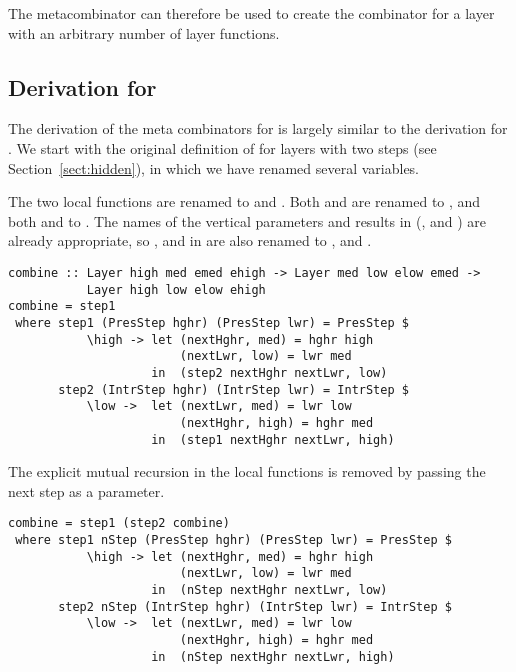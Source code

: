 \documentclass[preprint,natbib]{sigplanconf}
\begin{document}
The  metacombinator can therefore be used to create the  combinator for a layer with an arbitrary number of layer functions. \ec

%																
\subsection{Derivation for } \label{subsubsectcombine}


The derivation of the meta combinators for  is largely similar to the derivation for . We start with the original definition of  for layers with two steps (see Section~\ref{sect:hidden}), in which we have renamed several variables. 

\bc The two local functions are renamed to  and . Both  and  are renamed to , and both  and  to . The names of the vertical parameters and results in  (,  and ) are already appropriate, so ,  and  in  are also renamed to ,  and . \ec

\begin{small} %
\begin{verbatim}
combine :: Layer high med emed ehigh -> Layer med low elow emed -> 
           Layer high low elow ehigh
combine = step1
 where step1 (PresStep hghr) (PresStep lwr) = PresStep $
           \high -> let (nextHghr, med) = hghr high
                        (nextLwr, low) = lwr med
                    in  (step2 nextHghr nextLwr, low)
       step2 (IntrStep hghr) (IntrStep lwr) = IntrStep $
           \low ->  let (nextLwr, med) = lwr low
                        (nextHghr, high) = hghr med
                    in  (step1 nextHghr nextLwr, high)
\end{verbatim}
\end{small}

The explicit mutual recursion in the local functions is removed by passing the next step as a parameter.

\begin{small}
\begin{verbatim}
combine = step1 (step2 combine)
 where step1 nStep (PresStep hghr) (PresStep lwr) = PresStep $
           \high -> let (nextHghr, med) = hghr high
                        (nextLwr, low) = lwr med
                    in  (nStep nextHghr nextLwr, low)
       step2 nStep (IntrStep hghr) (IntrStep lwr) = IntrStep $
           \low ->  let (nextLwr, med) = lwr low
                        (nextHghr, high) = hghr med
                    in  (nStep nextHghr nextLwr, high)
\end{verbatim}
\end{small}
\end{document}

